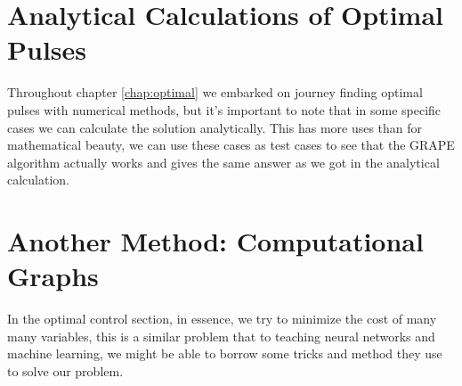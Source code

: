 \documentclass[english, a4paper, 12pt, twoside]{article}
\numberwithin{equation}{section} %
\begin{document}


\newpage
\section{Analytical Calculations of Optimal Pulses} \label{appen:annalytic}
Throughout chapter \ref{chap:optimal} we embarked on journey finding optimal pulses with numerical methods, but it's important to note that in some specific cases we can calculate the solution analytically. This has more uses than for mathematical beauty, we can use these cases as test cases to see that the GRAPE algorithm actually works and gives the same answer as we got in the analytical calculation.

\newpage
\section{Another Method: Computational Graphs}
In the optimal control section, in essence, we try to minimize the cost of many many variables, this is a similar problem that to teaching neural networks and machine learning, we might be able to borrow some tricks and method they use to solve our problem.
\end{document}
